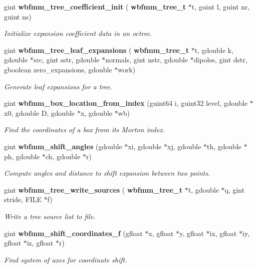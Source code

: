 \begin{DoxyCompactItemize}
gint \textbf{ wbfmm\+\_\+tree\+\_\+coefficient\+\_\+init} (\textbf{ wbfmm\+\_\+tree\+\_\+t} $\ast$t, guint l, guint nr, guint ns)
\begin{DoxyCompactList}\small\item\em Initialize expansion coefficient data in an octree. \end{DoxyCompactList}\item 
gint \textbf{ wbfmm\+\_\+tree\+\_\+leaf\+\_\+expansions} (\textbf{ wbfmm\+\_\+tree\+\_\+t} $\ast$t, gdouble k, gdouble $\ast$src, gint sstr, gdouble $\ast$normals, gint nstr, gdouble $\ast$dipoles, gint dstr, gboolean zero\+\_\+expansions, gdouble $\ast$work)
\begin{DoxyCompactList}\small\item\em Generate leaf expansions for a tree. \end{DoxyCompactList}\item 
gint \textbf{ wbfmm\+\_\+box\+\_\+location\+\_\+from\+\_\+index} (guint64 i, guint32 level, gdouble $\ast$x0, gdouble D, gdouble $\ast$x, gdouble $\ast$wb)
\begin{DoxyCompactList}\small\item\em Find the coordinates of a box from its Morton index. \end{DoxyCompactList}\item 
gint \textbf{ wbfmm\+\_\+shift\+\_\+angles} (gdouble $\ast$xi, gdouble $\ast$xj, gdouble $\ast$th, gdouble $\ast$ph, gdouble $\ast$ch, gdouble $\ast$r)
\begin{DoxyCompactList}\small\item\em Compute angles and distance to shift expansion between two points. \end{DoxyCompactList}\item 
gint \textbf{ wbfmm\+\_\+tree\+\_\+write\+\_\+sources} (\textbf{ wbfmm\+\_\+tree\+\_\+t} $\ast$t, gdouble $\ast$q, gint stride, F\+I\+LE $\ast$f)
\begin{DoxyCompactList}\small\item\em Write a tree source list to file. \end{DoxyCompactList}\item 
gint \textbf{ wbfmm\+\_\+shift\+\_\+coordinates\+\_\+f} (gfloat $\ast$x, gfloat $\ast$y, gfloat $\ast$ix, gfloat $\ast$iy, gfloat $\ast$iz, gfloat $\ast$r)
\begin{DoxyCompactList}\small\item\em Find system of axes for coordinate shift. \end{DoxyCompactList}\item 

\end{DoxyCompactItemize}
